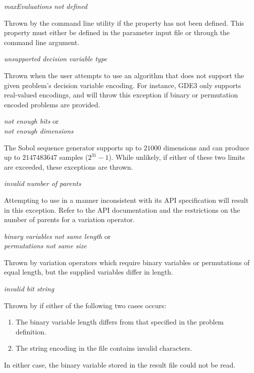 \noindent
\textit{maxEvaluations not defined}
\begin{indented}
  Thrown by the  command line utility if the  property has not been defined.  This property must either be defined in the parameter input file or through the  command line argument.
\end{indented}

\noindent
\textit{unsupported decision variable type}
\begin{indented}
  Thrown when the user attempts to use an algorithm that does not support the given problem's decision variable encoding.  For instance, GDE3 only supports real-valued encodings, and will throw this exception if binary or permutation encoded problems are provided.
\end{indented}

\noindent
\textit{not enough bits} or\\
\textit{not enough dimensions}
\begin{indented}
  The Sobol sequence generator supports up to $21000$ dimensions and can produce up to $2147483647$ samples ($2^{31}-1$).  While unlikely, if either of these two limits are exceeded, these exceptions are thrown.
\end{indented}

\noindent
\textit{invalid number of parents}
\begin{indented}
  Attempting to use  in a manner inconsistent with its API specification will result in this exception.  Refer to the API documentation and the restrictions on the number of parents for a variation operator.
\end{indented}

\noindent
\textit{binary variables not same length} or\\
\textit{permutations not same size}
\begin{indented}
  Thrown by variation operators which require binary variables or permutations of equal length, but the supplied variables differ in length.
\end{indented}

\noindent  
\textit{invalid bit string}
\begin{indented}
  Thrown by  if either of the following two cases occurs:
  \begin{enumerate}
    \item The binary variable length differs from that specified in the problem definition.
    \item The string encoding in the file contains invalid characters.
  \end{enumerate}
  In either case, the binary variable stored in the result file could not be read.
\end{indented}

